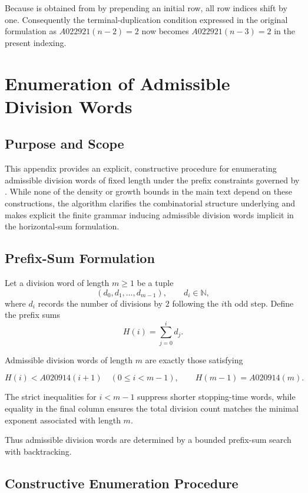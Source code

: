 \documentclass[12pt, oneside]{article}   	%
\numberwithin{equation}{section}          %
\theoremstyle{definition}
\begin{document}
Because  is obtained from  by prepending an initial row, all row indices
shift by one.  Consequently the terminal-duplication condition expressed in the original
formulation as $A022921(n-2)=2$ now becomes $A022921(n-3)=2$ in the present indexing.


\newpage
\section{Enumeration of Admissible Division Words}
\label{app:division-enumeration}

\subsection*{Purpose and Scope}

This appendix provides an explicit, constructive procedure for enumerating
admissible division words of fixed length under the prefix constraints governed by
.  While none of the density or growth bounds in the main text
depend on these constructions, the algorithm clarifies the combinatorial
structure underlying  and makes explicit the finite grammar
inducing admissible division words implicit in the horizontal-sum formulation.

\subsection*{Prefix-Sum Formulation}

Let a division word of length $m \ge 1$ be a tuple
\[
(d_0,d_1,\dots,d_{m-1}), \qquad d_i \in \mathbb{N},
\]
where $d_i$ records the number of divisions by $2$ following the $i$th odd step.
Define the prefix sums
\[
H(i) = \sum_{j=0}^{i} d_j .
\]

Admissible division words of length $m$ are exactly those satisfying

\[
H(i) < A020914(i+1) \quad (0 \le i < m-1), 
\qquad
H(m-1) = A020914(m).
\]

The strict inequalities for $i<m-1$ suppress shorter stopping-time words,
while equality in the final column ensures the total division count matches
the minimal exponent associated with length $m$.

Thus admissible division words are determined by a bounded prefix-sum search
with backtracking.


\subsection*{Constructive Enumeration Procedure}
\end{document}
